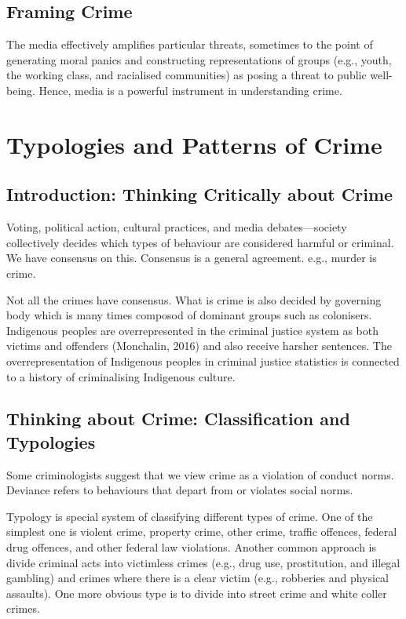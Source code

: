 \documentclass[11pt]{article}
\begin{document}
\subsection{Framing Crime}

The media effectively amplifies particular threats, sometimes to the point of generating moral panics and constructing representations of groups (e.g., youth, the working class, and racialised communities) as posing a threat to public well-being. Hence, media is a powerful instrument in understanding crime.

\section{Typologies and Patterns of Crime}


\subsection{Introduction: Thinking Critically about Crime}

Voting, political action, cultural practices, and media debates—society collectively decides which types of behaviour are considered harmful or criminal. We have consensus on this. Consensus is a general agreement. e.g., murder is crime.

Not all the crimes have consensus. What is crime is also decided by governing body which is many times composod of dominant groups such as colonisers. Indigenous peoples are overrepresented in the criminal justice system as both victims and offenders (Monchalin, 2016) and also receive harsher sentences. The overrepresentation of Indigenous peoples in criminal justice statistics is connected to a history of criminalising Indigenous culture.

\subsection{Thinking about Crime: Classification and Typologies}

Some criminologists suggest that we view crime as a violation of conduct norms. Deviance refers to behaviours that depart from or violates social norms.

Typology is special system of classifying different types of crime. One of the simplest one is violent crime, property crime, other crime, traffic offences, federal drug offences, and other federal law violations. Another common approach is divide criminal acts into victimless crimes (e.g., drug use, prostitution, and illegal gambling) and crimes where there is a clear victim (e.g., robberies and physical assaults). One more obvious type is to divide into street crime and white coller crimes.
\end{document}
